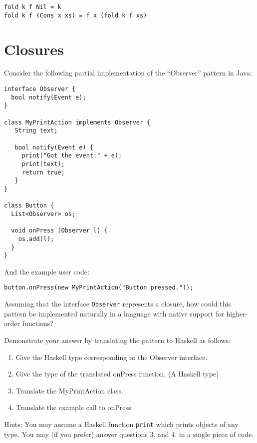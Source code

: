 \documentclass{article}
\newcommand{\answer}[1]{}
\begin{document}
\begin{verbatim}
fold k f Nil = k
fold k f (Cons x xs) = f x (fold k f xs)
\end{verbatim}
\answer{
  \begin{verbatim}
    map f = fold Nil (\x -> Cons (f x))
    append xs ys = fold ys Cons xs
    reverse = fold Nil (\x xs -> append xs (Cons x Nil))
  \end{verbatim}
}
\section{Closures}

Consider the following partial implementation of the ``Observer''
pattern in Java:
\begin{verbatim}
interface Observer {
  bool notify(Event e);
}

class MyPrintAction implements Observer {
   String text;

   bool notify(Event e) {
     print("Got the event:" + e);
     print(text);
     return true;
   }
}

class Button {
  List<Observer> os;

  void onPress (Observer l) {
    os.add(l);
  }
}
\end{verbatim}

And the example user code:

\begin{verbatim}
button.onPress(new MyPrintAction("Button pressed."));
\end{verbatim}

Assuming that the interface \texttt{Observer} represents a closure, how
could this pattern be implemented naturally in a language with native
support for higher-order functions?

Demonstrate your answer by translating the pattern to Haskell as
follows:
\begin{enumerate}
\item Give the Haskell type corresponding to the Observer interface.
\item Give the type of the translated onPress function. (A Haskell type) 
\item Translate the MyPrintAction class. 
\item Translate the example call to onPress. 
\end{enumerate}
Hints: You may assume a Haskell function \texttt{print} which prints
objects of any type.  You may (if you prefer) answer questions 3. and
4. in a single piece of code.
\end{document}
